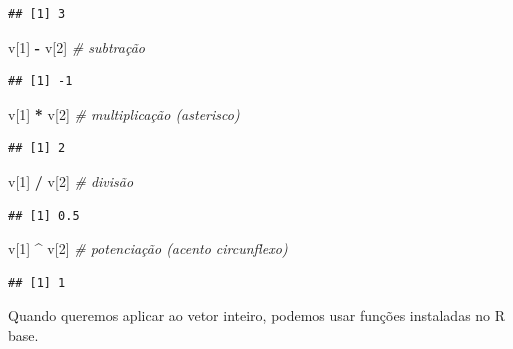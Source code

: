 \documentclass[
]{book}
\newenvironment{Shaded}{\begin{snugshade}}{\end{snugshade}}
\newcommand{\CommentTok}[1]{\textcolor[rgb]{0.56,0.35,0.01}{\textit{#1}}}
\newcommand{\DecValTok}[1]{\textcolor[rgb]{0.00,0.00,0.81}{#1}}
\newcommand{\NormalTok}[1]{#1}
\newcommand{\OperatorTok}[1]{\textcolor[rgb]{0.81,0.36,0.00}{\textbf{#1}}}
\newcommand{\StringTok}[1]{\textcolor[rgb]{0.31,0.60,0.02}{#1}}
\begin{document}
\begin{verbatim}
## [1] 3
\end{verbatim}

\begin{Shaded}
\begin{Highlighting}[]
\NormalTok{v[}\DecValTok{1}\NormalTok{] }\OperatorTok{-}\StringTok{ }\NormalTok{v[}\DecValTok{2}\NormalTok{] }\CommentTok{# subtração}
\end{Highlighting}
\end{Shaded}

\begin{verbatim}
## [1] -1
\end{verbatim}

\begin{Shaded}
\begin{Highlighting}[]
\NormalTok{v[}\DecValTok{1}\NormalTok{] }\OperatorTok{*}\StringTok{ }\NormalTok{v[}\DecValTok{2}\NormalTok{] }\CommentTok{# multiplicação (asterisco)}
\end{Highlighting}
\end{Shaded}

\begin{verbatim}
## [1] 2
\end{verbatim}

\begin{Shaded}
\begin{Highlighting}[]
\NormalTok{v[}\DecValTok{1}\NormalTok{] }\OperatorTok{/}\StringTok{ }\NormalTok{v[}\DecValTok{2}\NormalTok{] }\CommentTok{# divisão}
\end{Highlighting}
\end{Shaded}

\begin{verbatim}
## [1] 0.5
\end{verbatim}

\begin{Shaded}
\begin{Highlighting}[]
\NormalTok{v[}\DecValTok{1}\NormalTok{] }\OperatorTok{^}\StringTok{ }\NormalTok{v[}\DecValTok{2}\NormalTok{] }\CommentTok{# potenciação (acento circunflexo)}
\end{Highlighting}
\end{Shaded}

\begin{verbatim}
## [1] 1
\end{verbatim}

Quando queremos aplicar ao vetor inteiro, podemos usar funções instaladas no R base.
\end{document}

